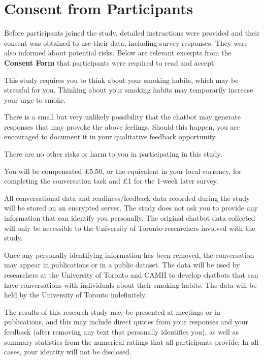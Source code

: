 \chapter{Consent from Participants}
\label{app-consent}


Before participants joined the study, detailed instructions were provided and their consent was obtained to use their data, including survey responses. They were also informed about potential risks. Below are relevant excerpts from the \textbf{Consent Form} that participants were required to read and accept.


\vspace{12pt}

\begin{tcolorbox}[breakable,title=WHAT ARE THE RISKS OR HARM OF PARTICIPATING IN THIS STUDY?]
	This study requires you to think about your smoking habits, which may be stressful for you. Thinking about your smoking habits may temporarily increase your urge to smoke.

	There is a small but very unlikely possibility that the chatbot may generate responses that may provoke the above feelings. Should this happen, you are encouraged to document it in your qualitative feedback opportunity.

	There are no other risks or harm to you in participating in this study.
\end{tcolorbox}

\vspace{12pt}

\begin{tcolorbox}[breakable,title=WHAT COMPENSATION AM I ENTITLED TO?]
	You will be compensated £5.50, or the equivalent in your local currency, for completing the conversation task and £1 for the 1-week later survey.
\end{tcolorbox}

\vspace{12pt}

\begin{tcolorbox}[breakable,title=HOW WILL MY PRIVACY BE RESPECTED?]
	All conversational data and readiness/feedback data recorded during the study will be stored on an encrypted server. The study does not ask you to provide any information that can identify you personally. The original chatbot data collected will only be accessible to the University of Toronto researchers involved with the study.

	Once any personally identifying information has been removed, the conversation may appear in publications or in a public dataset. The data will be used by researchers at the University of Toronto and CAMH to develop chatbots that can have conversations with individuals about their smoking habits. The data will be held by the University of Toronto indefinitely.

	The results of this research study may be presented at meetings or in publications, and this may include direct quotes from your responses and your feedback (after removing any text that personally identifies you), as well as summary statistics from the numerical ratings that all participants provide. In all cases, your identity will not be disclosed.
\end{tcolorbox}
